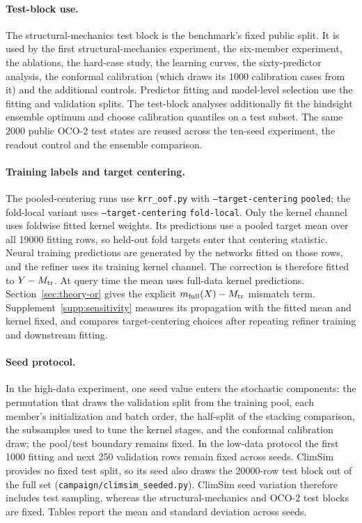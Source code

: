 \paragraph{Test-block use.} The structural-mechanics test block is the
benchmark's fixed public split. It is used by the first structural-mechanics experiment, the
six-member experiment, the ablations, the hard-case study, the learning curves,
the sixty-predictor analysis, the conformal calibration (which draws its
$1000$ calibration cases from it) and the additional controls. Predictor
fitting and model-level selection use the fitting and validation splits.
The test-block analyses additionally fit the hindsight ensemble optimum and choose calibration quantiles on a test subset.
The same $2000$ public OCO-2 test states are reused across the ten-seed
experiment, the readout control and the ensemble comparison.

\paragraph{Training labels and target centering.}
The pooled-centering runs use \texttt{krr\_oof.py} with
\texttt{--target-centering} \texttt{pooled}; the fold-local variant uses
\texttt{--target-centering} \texttt{fold-local}. Only the kernel channel uses foldwise fitted kernel weights. Its predictions use a pooled target mean over all 19000 fitting rows, so held-out fold targets enter that centering statistic. Neural training predictions are generated by the networks fitted on those rows, and the refiner uses its training kernel channel. The correction is therefore fitted to $Y-M_{\rm tr}$. At query time the mean uses full-data kernel predictions. Section~\ref{sec:theory-or} gives the explicit $m_{\rm full}(X)-M_{\rm tr}$ mismatch term. Supplement~\ref{supp:sensitivity} measures its propagation with the fitted mean and kernel fixed, and compares target-centering choices after repeating refiner training and downstream fitting.

\paragraph{Seed protocol.} In the high-data experiment, one seed value enters the stochastic components: the permutation that draws the validation split from the training pool,
each member's initialization and batch order, the half-split of the stacking
comparison, the subsamples used to tune the kernel stages, and the conformal
calibration draw; the pool/test boundary remains fixed. In the low-data protocol the first 1000 fitting and next 250 validation rows remain fixed across seeds. ClimSim provides no fixed test split,
so its seed also draws the $20000$-row test block out of the full set
(\texttt{campaign/climsim\_seeded.py}). ClimSim seed variation therefore includes test sampling, whereas the
structural-mechanics and OCO-2 test blocks are fixed. Tables report the
mean and standard deviation across seeds.

